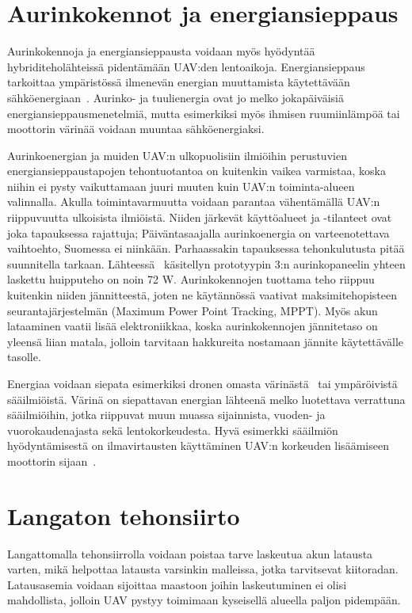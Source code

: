 \section{Aurinkokennot ja energiansieppaus}
Aurinkokennoja ja energiansieppausta voidaan myös hyödyntää
hybriditeholähteissä pidentämään UAV:den lentoaikoja. Energiansieppaus
tarkoittaa ympäristössä ilmenevän energian muuttamista käytettävään
sähköenergiaan~\cite{Anton2011}. Aurinko- ja tuulienergia ovat jo melko
jokapäiväisiä energiansieppausmenetelmiä, mutta esimerkiksi myös ihmisen
ruumiinlämpöä tai moottorin värinää voidaan muuntaa sähköenergiaksi.

Aurinkoenergian ja muiden UAV:n ulkopuolisiin ilmiöihin perustuvien
energiansieppaustapojen tehontuotantoa on kuitenkin vaikea varmistaa, koska
niihin ei pysty vaikuttamaan juuri muuten kuin UAV:n toiminta-alueen
valinnalla. Akulla toimintavarmuutta voidaan parantaa vähentämällä UAV:n
riippuvuutta ulkoisista ilmiöistä.  Niiden järkevät käyttöalueet ja -tilanteet
ovat joka tapauksessa rajattuja; Päiväntasaajalla aurinkoenergia on
varteenotettava vaihtoehto, Suomessa ei niinkään.  Parhaassakin tapauksessa
tehonkulutusta pitää suunnitella tarkaan.  Lähteessä~\cite{Jaw-KuenShiau2009}
käsitellyn prototyypin 3:n aurinkopaneelin yhteen laskettu huipputeho on noin
72 W. Aurinkokennojen tuottama teho riippuu kuitenkin niiden jännitteestä,
joten ne käytännössä vaativat maksimitehopisteen seurantajärjestelmän (Maximum
Power Point Tracking, MPPT). Myös akun lataaminen vaatii lisää elektroniikkaa,
koska aurinkokennojen jännitetaso on yleensä liian matala, jolloin tarvitaan
hakkureita nostamaan jännite käytettävälle tasolle.

Energiaa voidaan siepata esimerkiksi dronen omasta värinästä~\cite{Priya2009}
tai ympäröivistä sääilmiöistä. Värinä on siepattavan energian lähteenä melko
luotettava verrattuna sääilmiöihin, jotka riippuvat muun muassa sijainnista,
vuoden- ja vuorokaudenajasta sekä lentokorkeudesta. Hyvä esimerkki sääilmiön
hyödyntämisestä on ilmavirtausten käyttäminen UAV:n korkeuden lisäämiseen
moottorin sijaan~\cite{Cutler2010}.

\section{Langaton tehonsiirto}
Langattomalla tehonsiirrolla voidaan poistaa tarve laskeutua akun latausta
varten, mikä helpottaa latausta varsinkin malleissa, jotka tarvitsevat
kiitoradan. Latausasemia voidaan sijoittaa maastoon joihin laskeutuminen ei
olisi mahdollista, jolloin UAV pystyy toimimaan kyseisellä alueella paljon
pidempään.

